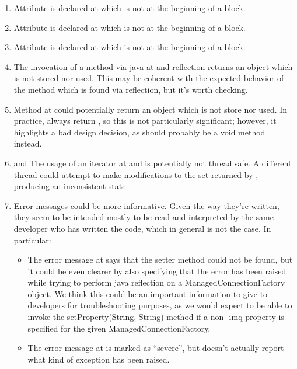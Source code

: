 \begin{enumerate}
	\item {} Attribute  is declared at  which is not at the beginning of a block.
	\item {} Attribute  is declared at  which is not at the beginning of a block.
	\item {} Attribute  is declared at  which is not at the beginning of a block.
	\item {} The invocation of a method via java at  and  reflection returns an  object which is not stored nor used. This may be coherent with the expected behavior of the  method which is found via reflection, but it's worth checking. 
	\item {} Method  at  could potentially return an  object which is not store nor used. In practice,  always return , so this is not particularly significant; however, it highlights a bad design decision, as  should probably be a void method instead. 
	\item {} and  The usage of an iterator at  and  is potentially not thread safe. A different thread could attempt to make modifications to the set returned by , producing an inconsistent state. 
	\item {} Error messages could be more informative. Given the way they're written, they seem to be intended mostly to be read and interpreted by the same developer who has written the code, which in general is not the case. In particular:
		\begin{itemize}
			\item The error message at  says that the setter method could not be found, but it could be even clearer by also specifying that the error has been raised while trying to perform java reflection on a ManagedConnectionFactory object. We think this could be an important information to give to developers for troubleshooting purposes, as we would expect to be able to invoke the setProperty(String, String) method if a non- imq property is specified for the given ManagedConnectionFactory. 
			\item The error message at  is marked as “severe”, but doesn't actually report what kind of exception has been raised. 

\end{itemize}
\end{enumerate}

